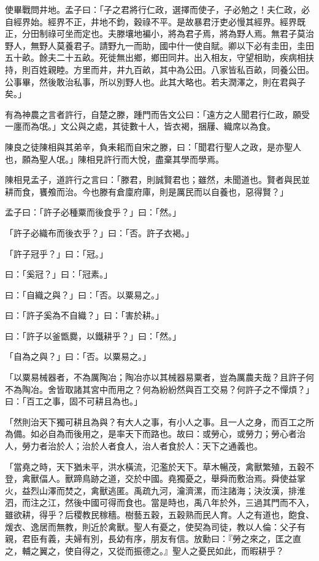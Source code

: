\begin{pinyinscope}
使畢戰問井地。孟子曰：「子之君將行仁政，選擇而使子，子必勉之！夫仁政，必自經界始。經界不正，井地不鈞，穀祿不平。是故暴君汙吏必慢其經界。經界既正，分田制祿可坐而定也。夫滕壤地褊小，將為君子焉，將為野人焉。無君子莫治野人，無野人莫養君子。請野九一而助，國中什一使自賦。卿以下必有圭田，圭田五十畝。餘夫二十五畝。死徙無出鄉，鄉田同井。出入相友，守望相助，疾病相扶持，則百姓親睦。方里而井，井九百畝，其中為公田。八家皆私百畝，同養公田。公事畢，然後敢治私事，所以別野人也。此其大略也。若夫潤澤之，則在君與子矣。」

有為神農之言者許行，自楚之滕，踵門而告文公曰：「遠方之人聞君行仁政，願受一廛而為氓。」文公與之處，其徒數十人，皆衣褐，捆屨、織席以為食。

陳良之徒陳相與其弟辛，負耒耜而自宋之滕，曰：「聞君行聖人之政，是亦聖人也，願為聖人氓。」陳相見許行而大悅，盡棄其學而學焉。

陳相見孟子，道許行之言曰：「滕君，則誠賢君也；雖然，未聞道也。賢者與民並耕而食，饔飧而治。今也滕有倉廩府庫，則是厲民而以自養也，惡得賢？」

孟子曰：「許子必種粟而後食乎？」曰：「然。」

「許子必織布而後衣乎？」曰：「否。許子衣褐。」

「許子冠乎？」曰：「冠。」

曰：「奚冠？」曰：「冠素。」

曰：「自織之與？」曰：「否。以粟易之。」

曰：「許子奚為不自織？」曰：「害於耕。」

曰：「許子以釜甑爨，以鐵耕乎？」曰：「然。」

「自為之與？」曰：「否。以粟易之。」

「以粟易械器者，不為厲陶冶；陶冶亦以其械器易粟者，豈為厲農夫哉？且許子何不為陶冶。舍皆取諸其宮中而用之？何為紛紛然與百工交易？何許子之不憚煩？」曰：「百工之事，固不可耕且為也。」

「然則治天下獨可耕且為與？有大人之事，有小人之事。且一人之身，而百工之所為備。如必自為而後用之，是率天下而路也。故曰：或勞心，或勞力；勞心者治人，勞力者治於人；治於人者食人，治人者食於人：天下之通義也。

「當堯之時，天下猶未平，洪水橫流，氾濫於天下。草木暢茂，禽獸繁殖，五穀不登，禽獸偪人。獸蹄鳥跡之道，交於中國。堯獨憂之，舉舜而敷治焉。舜使益掌火，益烈山澤而焚之，禽獸逃匿。禹疏九河，瀹濟漯，而注諸海；決汝漢，排淮泗，而注之江，然後中國可得而食也。當是時也，禹八年於外，三過其門而不入，雖欲耕，得乎？后稷教民稼穡。樹藝五穀，五穀熟而民人育。人之有道也，飽食、煖衣、逸居而無教，則近於禽獸。聖人有憂之，使契為司徒，教以人倫：父子有親，君臣有義，夫婦有別，長幼有序，朋友有信。放勳曰：『勞之來之，匡之直之，輔之翼之，使自得之，又從而振德之。』聖人之憂民如此，而暇耕乎？


\end{pinyinscope}
